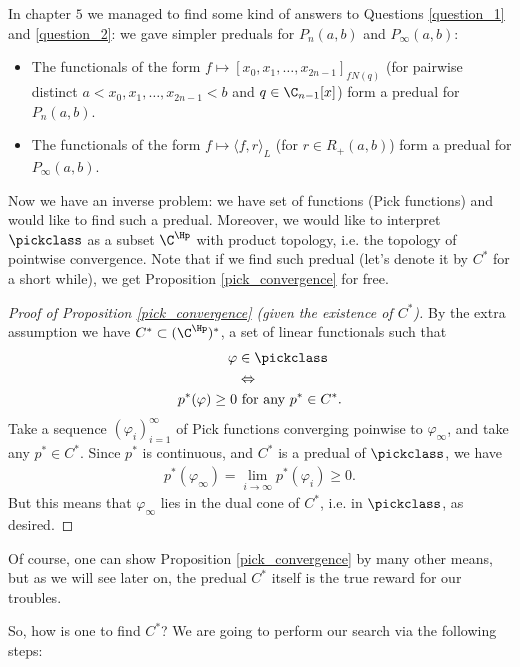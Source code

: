 In chapter $5$ we managed to find some kind of answers to Questions \ref{question_1} and \ref{question_2}: we gave simpler preduals for $P_{n}(a, b)$ and $P_{\infty}(a, b)$:

\begin{itemize}
	\item The functionals of the form $f \mapsto [x_{0}, x_{1}, \ldots, x_{2 n - 1}]_{f N(q)}$ (for pairwise distinct $a < x_{0}, x_{1}, \ldots, x_{2 n - 1} < b$ and $q \in \C_{n - 1}[x]$) form a predual for $P_{n}(a, b)$.
	\item The functionals of the form $f \mapsto \langle f, r \rangle_{L}$ (for $r \in R_{+}(a, b)$) form a predual for $P_{\infty}(a, b)$.
\end{itemize}

Now we have an inverse problem: we have set of functions (Pick functions) and would like to find such a predual. Moreover, we would like to interpret $\pickclass$ as a subset $\C^{\Hp}$ with product topology, i.e. the topology of pointwise convergence. Note that if we find such predual (let's denote it by $C^{*}$ for a short while), we get Proposition \ref{pick_convergence} for free.

\begin{proof}[Proof of Proposition \ref{pick_convergence} (given the existence of $C^{*}$)]
	By the extra assumption we have $C^{*} \subset (\C^{\Hp})^{*}$, a set of linear functionals such that
	\begin{align*}
		\varphi &\in \pickclass \\
		&\Leftrightarrow \\
		p^{*}(\varphi) \geq 0 &\text{ for any $p^{*} \in C^{*}$}.
	\end{align*}
	Take a sequence $(\varphi_{i})_{i = 1}^{\infty}$ of Pick functions converging poinwise to $\varphi_{\infty}$, and take any $p^{*} \in C^{*}$. Since $p^{*}$ is continuous, and $C^{*}$ is a predual of $\pickclass$, we have
	\begin{align*}
		p^{*}(\varphi_{\infty}) = \lim_{i \to \infty} p^{*}(\varphi_{i}) \geq 0.
	\end{align*}
	But this means that $\varphi_{\infty}$ lies in the dual cone of $C^{*}$, i.e. in $\pickclass$, as desired.
\end{proof}

Of course, one can show Proposition \ref{pick_convergence} by many other means, but as we will see later on, the predual $C^{*}$ itself is the true reward for our troubles.

So, how is one to find $C^{*}$? We are going to perform our search via the following steps:

